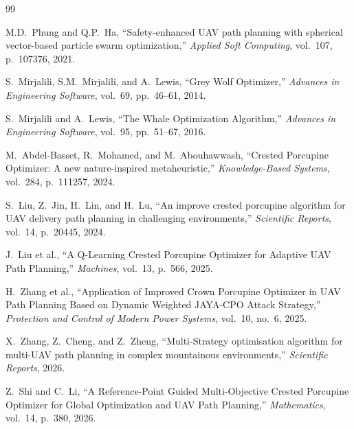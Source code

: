 \documentclass[11pt,a4paper]{article}
\begin{document}
\begin{thebibliography}{99}

 M.D.~Phung and Q.P.~Ha, ``Safety-enhanced UAV path planning with spherical vector-based particle swarm optimization,'' \textit{Applied Soft Computing}, vol.~107, p.~107376, 2021.

 S.~Mirjalili, S.M.~Mirjalili, and A.~Lewis, ``Grey Wolf Optimizer,'' \textit{Advances in Engineering Software}, vol.~69, pp.~46--61, 2014.

 S.~Mirjalili and A.~Lewis, ``The Whale Optimization Algorithm,'' \textit{Advances in Engineering Software}, vol.~95, pp.~51--67, 2016.

 M.~Abdel-Basset, R.~Mohamed, and M.~Abouhawwash, ``Crested Porcupine Optimizer: A new nature-inspired metaheuristic,'' \textit{Knowledge-Based Systems}, vol.~284, p.~111257, 2024.

 S.~Liu, Z.~Jin, H.~Lin, and H.~Lu, ``An improve crested porcupine algorithm for UAV delivery path planning in challenging environments,'' \textit{Scientific Reports}, vol.~14, p.~20445, 2024.

 J.~Liu et al., ``A Q-Learning Crested Porcupine Optimizer for Adaptive UAV Path Planning,'' \textit{Machines}, vol.~13, p.~566, 2025.

 H.~Zhang et al., ``Application of Improved Crown Porcupine Optimizer in UAV Path Planning Based on Dynamic Weighted JAYA-CPO Attack Strategy,'' \textit{Protection and Control of Modern Power Systems}, vol.~10, no.~6, 2025.

 X.~Zhang, Z.~Cheng, and Z.~Zheng, ``Multi-Strategy optimisation algorithm for multi-UAV path planning in complex mountainous environments,'' \textit{Scientific Reports}, 2026.

 Z.~Shi and C.~Li, ``A Reference-Point Guided Multi-Objective Crested Porcupine Optimizer for Global Optimization and UAV Path Planning,'' \textit{Mathematics}, vol.~14, p.~380, 2026.

\end{thebibliography}
\end{document}
